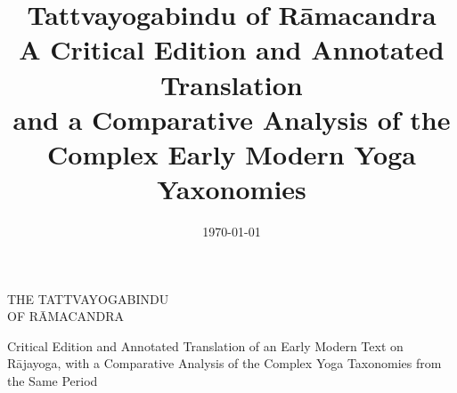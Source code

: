 

\title{Tattvayogabindu of Rāmacandra\\ A Critical Edition and Annotated Translation\\ and a Comparative Analysis of the \\Complex Early Modern Yoga Yaxonomies }
\date{\today}
\parindent=15pt



\frontmatter
\thispagestyle{empty} %


\vspace*{\fill}
\begin{center}
\huge\MakeUppercase{The Tattvayogabindu \\of Rāmacandra}\\

\vspace{0.2in}

\Large  Critical Edition and Annotated Translation of an Early Modern Text on Rājayoga, with a Comparative Analysis of the Complex Yoga Taxonomies from the Same Period\\ 
\end{center}



